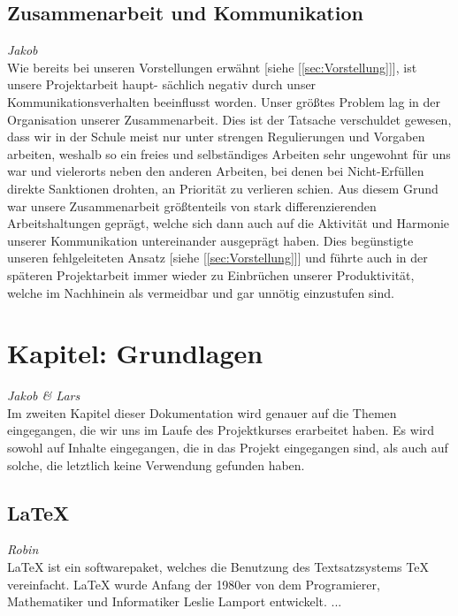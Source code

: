 \documentclass[12pt,a4paper,bibliography=totocnumbered,listof=totocnumbered]{scrartcl}
\begin{document}
\pagebreak
\subsection{Zusammenarbeit und Kommunikation}
\emph{Jakob}\\
Wie bereits bei unseren Vorstellungen erwähnt [siehe [\ref{sec:Vorstellung}]], ist unsere Projektarbeit haupt- sächlich negativ durch unser Kommunikationsverhalten beeinflusst worden.
Unser größtes Problem lag in der Organisation unserer Zusammenarbeit. Dies ist der Tatsache verschuldet gewesen, dass wir in der Schule meist nur unter strengen Regulierungen und Vorgaben arbeiten, weshalb so ein freies und selbständiges Arbeiten sehr ungewohnt für uns war und vielerorts neben den anderen Arbeiten, bei denen bei \glqq Nicht-Erfüllen\grqq{} direkte Sanktionen drohten, an Priorität zu verlieren schien.
Aus diesem Grund war unsere Zusammenarbeit größtenteils von stark differenzierenden Arbeitshaltungen geprägt, welche sich dann auch auf die Aktivität und Harmonie unserer Kommunikation untereinander ausgeprägt haben.
Dies begünstigte unseren fehlgeleiteten Ansatz [siehe [\ref{sec:Vorstellung}]] und führte auch in der späteren Projektarbeit immer wieder zu Einbrüchen unserer Produktivität, welche im Nachhinein als vermeidbar und gar unnötig einzustufen sind.

\pagebreak

\section{Kapitel: Grundlagen}
\emph{Jakob \emph{\&} Lars}\\
Im zweiten Kapitel dieser Dokumentation wird genauer auf die Themen eingegangen, die wir uns im Laufe des Projektkurses erarbeitet haben. 
Es wird sowohl auf Inhalte eingegangen, die in das Projekt eingegangen sind, als auch auf solche, die letztlich keine Verwendung gefunden haben.

\subsection{LaTeX}
\label{sec:LaTeX}
\emph{Robin}\\
LaTeX ist ein softwarepaket, welches die Benutzung des Textsatzsystems TeX vereinfacht. LaTeX wurde Anfang der 1980er von dem Programierer, Mathematiker und Informatiker Leslie Lamport entwickelt.\cite{LaTeX}\cite{Lamport}
...
\end{document}
